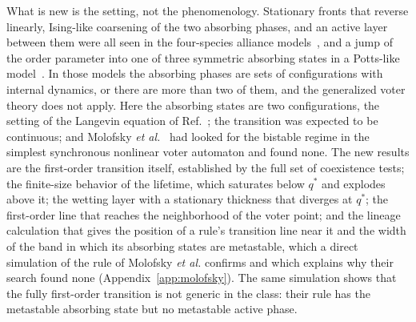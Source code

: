 \documentclass[pre,twocolumn,superscriptaddress,showpacs,floatfix]{revtex4-2}
\newcommand{\qs}{q^{*}}
\begin{document}
What is new is the setting, not the phenomenology. Stationary fronts that reverse linearly,
Ising-like coarsening of the two absorbing phases, and an active layer between them were all
seen in the four-species alliance models~\cite{szabo2004,szabo2007,guisoni2013}, and a jump of
the order parameter into one of three symmetric absorbing states in a Potts-like
model~\cite{lipowski2002,azizi2018}. In those models the absorbing phases are sets of
configurations with internal dynamics, or there are more than two of them, and the generalized
voter theory does not apply. Here the absorbing states are two configurations, the setting of
the Langevin equation of Ref.~\cite{alhammal2005}; the transition was expected to be continuous;
and Molofsky \emph{et al.}~\cite{molofsky1999} had looked for the bistable regime in the simplest
synchronous nonlinear voter automaton and found none. The new results are the first-order
transition itself, established by the full set of coexistence tests; the finite-size behavior of
the lifetime, which saturates below $\qs$ and explodes above it; the wetting layer with a
stationary thickness that diverges at $\qs$; the first-order line that reaches the neighborhood
of the voter point; and the lineage calculation that gives the position of a rule's transition
line near it and the width of the band in which its absorbing states are metastable, which a
direct simulation of the rule of Molofsky \emph{et al.} confirms and which explains why their
search found none (Appendix~\ref{app:molofsky}). The same simulation shows that the fully
first-order transition is not generic in the class: their rule has the metastable absorbing
state but no metastable active phase.
\end{document}
